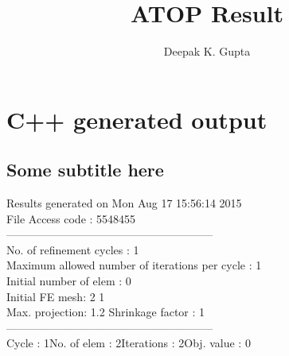 \documentclass{article}
\title{ATOP Result}
\author{Deepak K. Gupta}
\begin{document}
\maketitle
\section{C++ generated output}
\subsection{Some subtitle here}
{\selectfont
Results generated  on Mon Aug 17 15:56:14 2015
\\File Access code : 5548455\\ 
--------------------------------------------------------\\ 
No. of refinement cycles : 1\\
Maximum allowed number of iterations per cycle : 1\\
Initial number of elem : 0\\ 
Initial FE mesh: 2 1\\ 
Max. projection: 1.2 Shrinkage factor : 1\\ 
--------------------------------------------------------\\ 
Cycle : 1\qquad No. of elem : 2\qquad Iterations : 2\qquad Obj. value : 0\qquad 
}
\begin{figure}[H] 
\centering 
\begin{subfigure}{.45\linewidth} \centering 
{}  
\end{subfigure}  
\hfill  
\begin{subfigure}{.45\linewidth} \centering 
{}  
\end{subfigure}  
\end{figure}  
\end{document}
